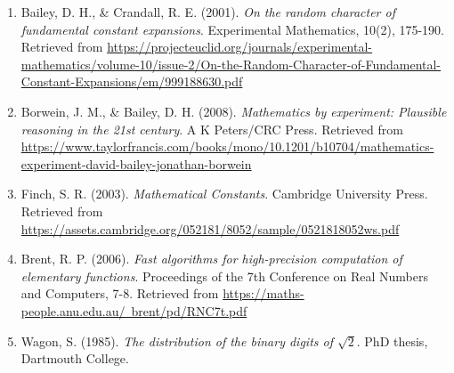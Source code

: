 
\begin{enumerate}
    \item Bailey, D. H., \& Crandall, R. E. (2001). \textit{On the random character of fundamental constant expansions}. Experimental Mathematics, 10(2), 175-190. Retrieved from \href{https://projecteuclid.org/journals/experimental-mathematics/volume-10/issue-2/On-the-Random-Character-of-Fundamental-Constant-Expansions/em/999188630.pdf}{https://projecteuclid.org/journals/experimental-mathematics/volume-10/issue-2/On-the-Random-Character-of-Fundamental-Constant-Expansions/em/999188630.pdf}
    
    \item Borwein, J. M., \& Bailey, D. H. (2008). \textit{Mathematics by experiment: Plausible reasoning in the 21st century}. A K Peters/CRC Press. Retrieved from \href{https://www.taylorfrancis.com/books/mono/10.1201/b10704/mathematics-experiment-david-bailey-jonathan-borwein}{https://www.taylorfrancis.com/books/mono/10.1201/b10704/mathematics-experiment-david-bailey-jonathan-borwein}
    
    \item Finch, S. R. (2003). \textit{Mathematical Constants}. Cambridge University Press. Retrieved from \href{https://assets.cambridge.org/052181/8052/sample/0521818052ws.pdf}{https://assets.cambridge.org/052181/8052/sample/0521818052ws.pdf}
    
    \item Brent, R. P. (2006). \textit{Fast algorithms for high-precision computation of elementary functions}. Proceedings of the 7th Conference on Real Numbers and Computers, 7-8. Retrieved from \href{https://maths-people.anu.edu.au/~brent/pd/RNC7t.pdf}{https://maths-people.anu.edu.au/~brent/pd/RNC7t.pdf}
    
    \item Wagon, S. (1985). \textit{The distribution of the binary digits of $\sqrt{2}$}. PhD thesis, Dartmouth College.
\end{enumerate}

